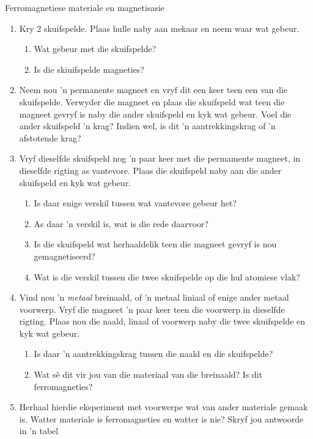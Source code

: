 \begin{Investigation}{Ferromagnetiese materiale en magnetisasie}
            \nopagebreak
\begin{enumerate}[noitemsep, label=\textbf{\arabic*}. ] 
\item Kry 2 skuifspelde. Plaas hulle naby aan mekaar en neem waar wat gebeur.
\begin{enumerate}[noitemsep, label=\textbf{\alph*}. ] 
    \item Wat gebeur met die skuifspelde?
    \item Is die skiuifspelde magneties?
\end{enumerate}

\item Neem nou 'n permanente magneet en vryf dit een keer teen een van die skuifspelde. Verwyder die magneet en plaas die skuifspeld wat teen die magneet gevryf is naby die ander skuifspeld en kyk wat gebeur.  Voel die ander skuifspeld 'n krag? Indien wel, is dit 'n aantrekkingskrag of 'n afstotende krag? 
\item Vryf dieselfde skuifspeld nog 'n paar keer met die permamente magneet, in dieselfde rigting as vantevore. Plaas die skuifspeld naby aan die ander skuifspeld en kyk wat gebeur.

\begin{enumerate}[noitemsep, label=\textbf{\alph*}. ] 
    \item Is daar enige verskil tussen wat vantevore gebeur het? 
    \item As daar 'n verskil is, wat is die rede daarvoor? 
    \item Is die skuifspeld wat herhaaldelik teen die magneet gevryf is nou gemagnetiseerd? 
    \item Wat is die verskil tussen die twee skuifspelde op die hul atomiese vlak? 
\end{enumerate}

\item Vind nou 'n \textsl{metaal} breinaald, of 'n metaal liniaal of enige ander metaal voorwerp. Vryf die magneet 'n paar keer teen die voorwerp in dieselfde rigting. Plaas nou die naald, linaal of voorwerp naby die twee skuifspelde en kyk wat gebeur. 

\begin{enumerate}[noitemsep, label=\textbf{\alph*}. ] 
    \item Is daar 'n aantrekkingskrag tussen die naald en die skuifspelde?
    \item Wat s\^e dit vir jou van die materiaal van die breinaald? Is dit ferromagneties?
\end{enumerate}

\item Herhaal hierdie eksperiment met voorwerpe wat van ander materiale gemaak is. Watter materiale is ferromagneties en watter is nie? Skryf jou antwoorde in 'n tabel
\end{enumerate}
\end{Investigation}

